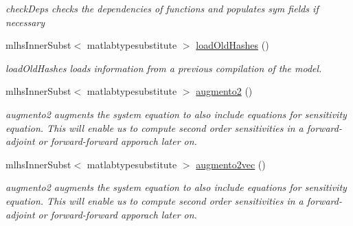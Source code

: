 \begin{DoxyCompactItemize}
\begin{DoxyCompactList}\small\item\em check\+Deps checks the dependencies of functions and populates sym fields if necessary \end{DoxyCompactList}\item 
mlhs\+Inner\+Subst$<$ matlabtypesubstitute $>$ \mbox{\hyperlink{classamimodel_a93346c96338624e417ee9732ffd96b28}{load\+Old\+Hashes}} ()
\begin{DoxyCompactList}\small\item\em load\+Old\+Hashes loads information from a previous compilation of the model. \end{DoxyCompactList}\item 
mlhs\+Inner\+Subst$<$ matlabtypesubstitute $>$ \mbox{\hyperlink{classamimodel_abddb278082c1ff018f3b0ef121bba51a}{augmento2}} ()
\begin{DoxyCompactList}\small\item\em augmento2 augments the system equation to also include equations for sensitivity equation. This will enable us to compute second order sensitivities in a forward-\/adjoint or forward-\/forward apporach later on. \end{DoxyCompactList}\item 
mlhs\+Inner\+Subst$<$ matlabtypesubstitute $>$ \mbox{\hyperlink{classamimodel_ab8fea0d36484809cb38e0035a564e919}{augmento2vec}} ()
\begin{DoxyCompactList}\small\item\em augmento2 augments the system equation to also include equations for sensitivity equation. This will enable us to compute second order sensitivities in a forward-\/adjoint or forward-\/forward apporach later on. \end{DoxyCompactList}\end{DoxyCompactItemize}
